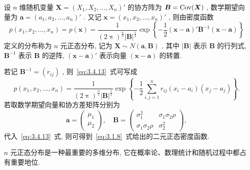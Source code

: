 	\begin{example}[( $n$ 元正态分布)]\label{exam:3.4.12}
		设 $n$ 维随机变量 $\boldsymbol{X}=(X_1,X_2,\ldots,X_n)'$ 的协方阵为 $\boldsymbol{B}=\operatorname{Cov}(\boldsymbol{X})$ , 数学期望向量为 $\boldsymbol{a}=(a_1,a_2,\ldots,a_n)'$ . 又记 $\boldsymbol{x}=(x_1,x_2,\ldots,x_n)'$ , 则由密度函数
		\begin{equation}\label{eq:3.4.13}
			p(x_1,x_2,\ldots,x_n)=p(\boldsymbol{x})=\frac{1}{ (2\uppi)^{\frac{n}{2}} |\boldsymbol{B}|^{\frac{1}{2}} }\exp\left\{ -\frac{1}{2}(\boldsymbol{x}-\boldsymbol{a})'\boldsymbol{B}^{-1}(\boldsymbol{x}-\boldsymbol{a}) \right\}
		\end{equation}
		定义的分布称为 $n$ 元正态分布, 记为 $\boldsymbol{X}\sim N(\boldsymbol{a},\boldsymbol{B})$ . 其中 $|\boldsymbol{B}|$ 表示 $\boldsymbol{B}$ 的行列式, $\boldsymbol{B}^{-1}$ 表示 $\boldsymbol{B}$ 的逆阵, $(\boldsymbol{x}-\boldsymbol{a})'$ 表示向量 $(\boldsymbol{x}-\boldsymbol{a})$ 的转置.

		若记 $\boldsymbol{B}^{-1}=(r_{ij})$ , 则~\eqref{eq:3.4.13}~式可写成
		\begin{equation}\label{eq:3.4.14}
			p\left(x_{1}, x_{2}, \ldots, x_{n}\right)=\frac{1}{ (2\uppi)^{\frac{n}{2}} |\boldsymbol{B}|^{\frac{1}{2}} }\exp\left\{ -\frac{1}{2}\sum_{i,j=1}^{n}r_{ij}(x_{i}-a_{i})(x_{j}-a_{j}) \right\}.
		\end{equation}
		若取数学期望向量和协方差矩阵分别为
		\begin{equation*}
			\boldsymbol{a}=\begin{pmatrix}
				\mu_1\\
				\mu_2
			\end{pmatrix},\quad \boldsymbol{B}=\begin{pmatrix}
				\sigma_1^2 & \sigma_1\sigma_2\rho\\
				\sigma_1\sigma_2\rho & \sigma_2^2
			\end{pmatrix},
		\end{equation*}
		代入~\eqref{eq:3.4.13}~式, 则可得到~\eqref{eq:3.1.8}~式给出的二元正态密度函数.

		$n$ 元正态分布是一种最重要的多维分布, 它在概率论、数理统计和随机过程中都占有重要地位.
	\end{example}
